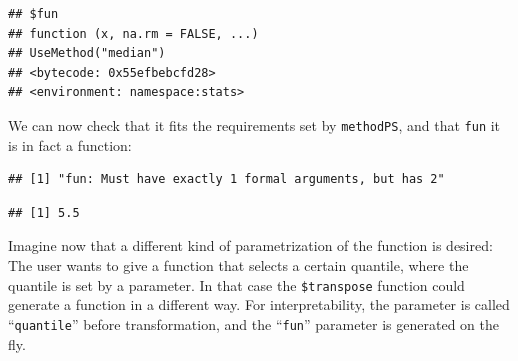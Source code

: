 \documentclass[
]{scrbook}
\newenvironment{Shaded}{\begin{snugshade}}{\end{snugshade}}
\newcommand{\AttributeTok}[1]{\textcolor[rgb]{0.77,0.63,0.00}{#1}}
\newcommand{\CommentTok}[1]{\textcolor[rgb]{0.56,0.35,0.01}{\textit{#1}}}
\newcommand{\ControlFlowTok}[1]{\textcolor[rgb]{0.13,0.29,0.53}{\textbf{#1}}}
\newcommand{\DecValTok}[1]{\textcolor[rgb]{0.00,0.00,0.81}{#1}}
\newcommand{\FunctionTok}[1]{\textcolor[rgb]{0.00,0.00,0.00}{#1}}
\newcommand{\NormalTok}[1]{#1}
\newcommand{\OtherTok}[1]{\textcolor[rgb]{0.56,0.35,0.01}{#1}}
\newcommand{\SpecialCharTok}[1]{\textcolor[rgb]{0.00,0.00,0.00}{#1}}
\newcommand{\StringTok}[1]{\textcolor[rgb]{0.31,0.60,0.02}{#1}}
\renewenvironment{Shaded} {\begin{snugshade}\small} {\end{snugshade}}
\begin{document}
\begin{verbatim}
## $fun
## function (x, na.rm = FALSE, ...) 
## UseMethod("median")
## <bytecode: 0x55efbebcfd28>
## <environment: namespace:stats>
\end{verbatim}

We can now check that it fits the requirements set by \texttt{methodPS}, and that \texttt{fun} it is in fact a function:

\begin{Shaded}
\end{Shaded}

\begin{verbatim}
## [1] "fun: Must have exactly 1 formal arguments, but has 2"
\end{verbatim}

\begin{Shaded}
\end{Shaded}

\begin{verbatim}
## [1] 5.5
\end{verbatim}

Imagine now that a different kind of parametrization of the function is desired:
The user wants to give a function that selects a certain quantile, where the quantile is set by a parameter.
In that case the \texttt{\$transpose} function could generate a function in a different way.
For interpretability, the parameter is called ``\texttt{quantile}'' before transformation, and the ``\texttt{fun}'' parameter is generated on the fly.

\begin{Shaded}
\end{Shaded}
\end{document}
